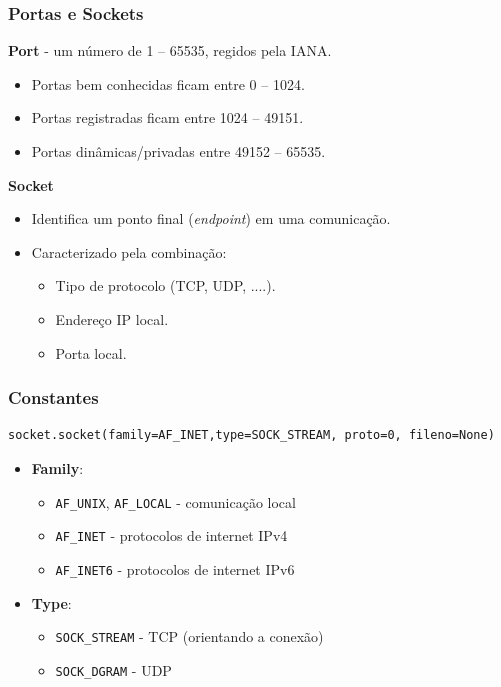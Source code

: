 \documentclass[xcolor=dvipsnames,10pt,compress,aspectratio=169]{beamer}
\begin{document}
\begin{frame}
  \frametitle{Portas e Sockets}
  {\bf Port} - um número de 1 -- 65535, regidos pela IANA.
  \begin{itemize}
  \item Portas bem conhecidas ficam entre 0 -- 1024.
  \item Portas registradas ficam entre 1024 -- 49151.
  \item Portas dinâmicas/privadas entre 49152 -- 65535.
  \end{itemize}
  {\bf Socket}
  \begin{itemize}
  \item Identifica um ponto final (\emph{endpoint}) em uma comunicação.
  \item Caracterizado pela combinação:
    \begin{itemize}
    \item Tipo de protocolo (TCP, UDP, ....).
    \item Endereço IP local.
    \item Porta local.
    \end{itemize}
  \end{itemize}
\end{frame}
\begin{frame}[fragile]
  \frametitle{Constantes}
\begin{lstlisting}
socket.socket(family=AF_INET,type=SOCK_STREAM, proto=0, fileno=None)
\end{lstlisting}
\begin{itemize}
\item \textbf{Family}:
  \begin{itemize}
    \item \texttt{AF\_UNIX}, \texttt{AF\_LOCAL} - comunicação local
    \item \texttt{AF\_INET} - protocolos de internet IPv4
    \item \texttt{AF\_INET6} - protocolos de internet IPv6
  \end{itemize}
\item \textbf{Type}:
  \begin{itemize}
    \item \texttt{SOCK\_STREAM} - TCP (orientando a conexão)
    \item \texttt{SOCK\_DGRAM} - UDP
  \end{itemize}
\end{itemize}
\end{frame}
\end{document}
